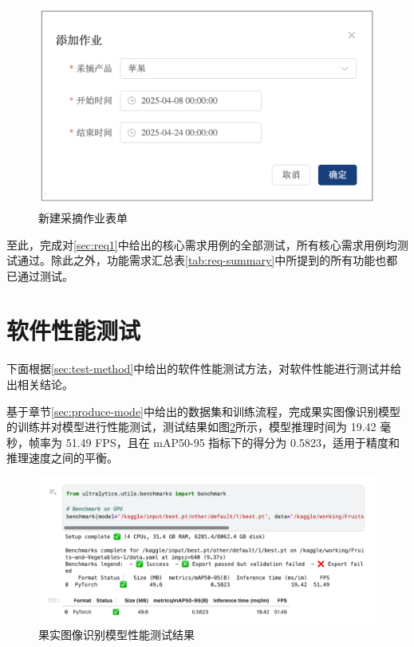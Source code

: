 \begin{figure}
    \centering
    \includegraphics[width=0.8\linewidth]{../result/form-new-work.png}
    \caption{新建采摘作业表单}
    \label{fig:form-new-work}
\end{figure}

至此，完成对\ref{sec:req1}中给出的核心需求用例的全部测试，所有核心需求用例均测试通过。除此之外，功能需求汇总表\ref{tab:req-summary}中所提到的所有功能也都已通过测试。

\section{软件性能测试}\label{sec:test-perf}

下面根据\ref{sec:test-method}中给出的软件性能测试方法，对软件性能进行测试并给出相关结论。

基于章节\ref{sec:produce-mode}中给出的数据集和训练流程，完成果实图像识别模型的训练并对模型进行性能测试，测试结果如图\ref{fig:model-benchmark}所示，模型推理时间为 19.42 毫秒，帧率为 51.49 FPS，且在 mAP50-95 指标下的得分为 0.5823，适用于精度和推理速度之间的平衡。

\begin{figure}
    \centering
    \includegraphics[width=0.95\linewidth]{../source/aws-img/yolov8/benchmark.png}
    \caption{果实图像识别模型性能测试结果}
    \label{fig:model-benchmark}
\end{figure}

